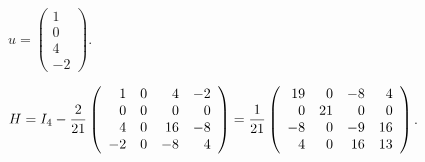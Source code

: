 \documentclass{ximera}
\begin{document}
\begin{exercise} \label{c7.9.3d}
$u = \left(\begin{array}{r} 1\\ 0 \\ 4\\ -2\end{array}\right)$.

\begin{solution}

$H = I_4 - \displaystyle\frac{2}{21}\left(\begin{array}{rrrr} 1 & 0 & 4 & -2 \\
0 & 0 & 0 & 0 \\ 4 & 0 & 16 & -8 \\ -2 & 0 & -8 & 4 \end{array}\right)
= \frac{1}{21}\left(\begin{array}{rrrr} 19 & 0 & -8 & 4 \\
0 & 21 & 0 & 0 \\ -8 & 0 & -9 & 16 \\ 4 & 0 & 16 & 13
\end{array}\right)$.

\end{solution}
\end{exercise}
\end{document}
